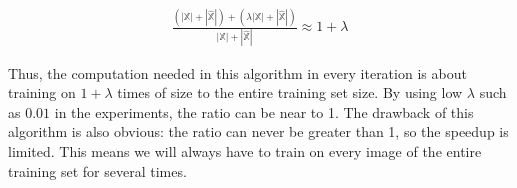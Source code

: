 \begin{align}
\frac{(|\mathbb{X}| + |\hat{\mathbb{X}}|)+(\lambda|\mathbb{X}| + |\hat{\mathbb{X}}|)}{|\mathbb{X}| + |\hat{\mathbb{X}}|} \approx 1 + \lambda
\label{eq:slow}
\end{align}

Thus, the computation needed in this algorithm in every iteration is about training on $1+\lambda$ times of size to the entire training set size. By using low $\lambda$ such as $0.01$ in the experiments, the ratio can be near to 1. The drawback of this algorithm is also obvious: the ratio can never be greater than 1, so the speedup is limited. This means we will always have to train on every image of the entire training set for several times.




